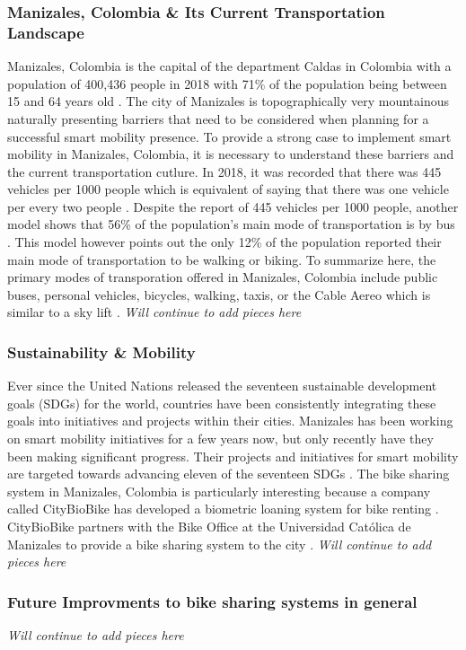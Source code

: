 \documentclass[12pt]{article}
\begin{document}
\subsubsection*{Manizales, Colombia \& Its Current Transportation Landscape}
Manizales, Colombia is the capital of the department Caldas in Colombia with a population of 400,436 people in 2018 with
71\% of the population being between 15 and 64 years old \cite{CalidaddeVida}. The city of Manizales is topographically very mountainous
naturally presenting barriers that need to be considered when planning for a successful smart mobility presence. To provide a strong case
to implement smart mobility in Manizales, Colombia, it is necessary to understand these barriers and the current transportation cutlure. In 2018, it was 
recorded that there was 445 vehicles per 1000 people which is equivalent of saying that there was one vehicle per every two people \cite{CalidaddeVida}.
Despite the report of 445 vehicles per 1000 people, another model shows that 56\% of the population's main mode of transportation is by bus \cite{CalidaddeVida}. 
This model however points out the only 12\% of the population reported their main mode of transportation to be walking or biking. To summarize here, the primary modes
of transporation offered in Manizales, Colombia include public buses, personal vehicles, bicycles, walking, taxis, or the Cable Aereo which is similar to a sky lift \cite{CalidaddeVida}.  
\textit{Will continue to add pieces here} 
\subsubsection*{Sustainability \& Mobility}
Ever since the United Nations released the seventeen sustainable development goals (SDGs) for the world, countries have been consistently integrating
these goals into initiatives and projects within their cities. Manizales has been working on 
smart mobility initiatives for a few years now, but only recently have they been making significant progress. Their projects and initiatives for smart mobility 
are targeted towards advancing eleven of the seventeen SDGs \cite{OficinaDeLaBici}. The bike sharing system in Manizales, Colombia is particularly interesting 
because a company called CityBioBike has developed a biometric loaning system for bike renting \cite{CityBioBike}. CityBioBike partners with the Bike Office at 
the Universidad Católica de Manizales to provide a bike sharing system to the city \cite{OficinaDeLaBiciHome}.  
\textit{Will continue to add pieces here} 
\subsubsection*{Future Improvments to bike sharing systems in general}
\textit{Will continue to add pieces here} 
\printbibliography
\end{document}
